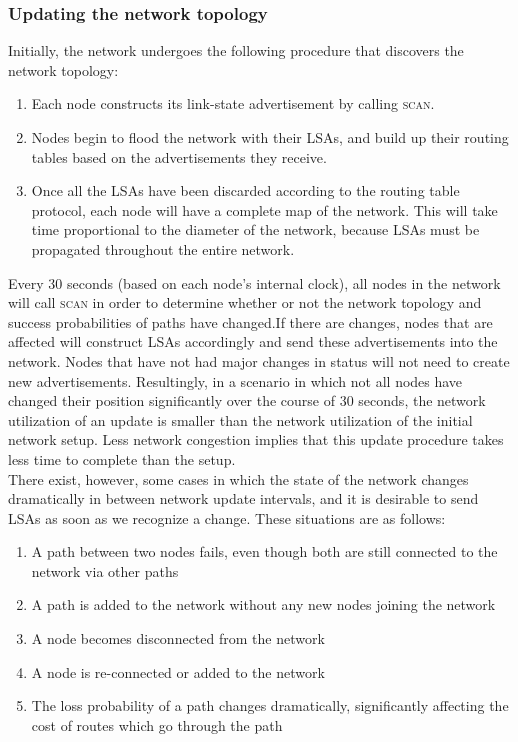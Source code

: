 \documentclass[letterpaper]{article}
\begin{document}
\subsubsection{Updating the network topology}

\noindent Initially, the network undergoes the following procedure that discovers the network topology:

\begin{enumerate}
  \item Each node constructs its link-state advertisement by calling \textsc{scan}. 
  \item Nodes begin to flood the network with their LSAs, and build up their routing tables based on
  the advertisements they receive.
  \item Once all the LSAs have been discarded according to the routing table protocol, each node will have
  a complete map of the network. This will take time proportional to the diameter of the network, because
  LSAs must be propagated throughout the entire network.
\end{enumerate}

\noindent Every 30 seconds (based on each node's internal clock), all nodes in the network will call 
\textsc{scan} in order to determine whether or not the network topology and success probabilities of
paths have changed.If there are changes, nodes that are affected will construct LSAs accordingly and send
these advertisements into the network. Nodes that have not had major changes in status will not need to
create new advertisements. Resultingly, in a scenario in which not all nodes have changed their position
significantly over the course of 30 seconds, the network utilization of an update is smaller than the
network utilization of the initial network setup. Less network congestion implies that this update
procedure takes less time to complete than the setup.
\\

\noindent There exist, however, some cases in which the state of the network changes dramatically in 
between network update intervals, and it is desirable to send LSAs as soon as we recognize a change.
These situations are as follows:

\begin{enumerate}
  \item A path between two nodes fails, even though both are still connected to the network via other
  paths
  \item A path is added to the network without any new nodes joining the network
  \item A node becomes disconnected from the network
  \item A node is re-connected or added to the network
  \item The loss probability of a path changes dramatically, significantly affecting the cost of
  routes which go through the path
\end{enumerate}
\end{document}
